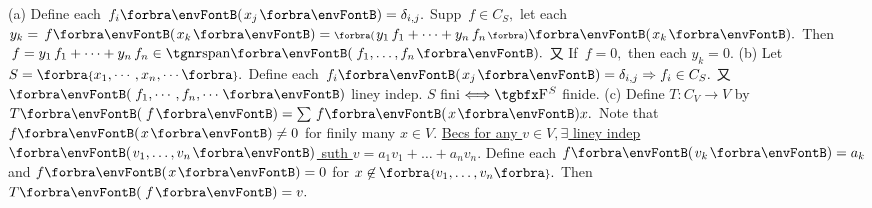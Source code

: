 (a) Define each $\,f_i\Par{x_j}=\delta_{i,j}.$ Supp $\,f\in C_S,$ let each $y_k=\,f\Par{x_k}=\BigPar{y_1\,f_1+\dots+y_n\,f_n}\Par{x_k}.$\parSol{\Ha}
Then $\,f=y_1\,f_1+\dots+y_n\,f_n\in\Span{\,f_1,\dots,f_n}.$ 又 If $\,f=0,$ then each $y_k=0.$\vspace{3pt}\parSol{}
(b) Let $S=\Bra{x_1,\cdots,x_n,\cdots}.$ Define each $\,f_i\Par{x_j}=\delta_{i,j}\Rightarrow f_i\in C_S.$ 又 $\Par{\,f_1,\cdots,f_n,\cdots}$ liney indep.\parSol{\Hb}
\ACoro $S$ fini $\Longleftrightarrow\FbbP{S}$ finide.\vspace{3pt}\parSol{}
(c) Define $T:C_V\rightarrow V$ by $T\Par{\,f}=\sum\,f\Par{x}x.$ Note that $f\Par{x}\neq0$ for finily many $x\in V.$\parSol{\Hc}
\uline{Becs for any $v\in V,\exists$ liney indep $\Par{v_1,\dots,v_n}$ suth $v=a_1v_1+\dots+a_nv_n.$} \parSol{\Hc}
Define each $\:\!f\Par{v_k}=a_k$ and $f\Par{x}=0$ for $x\not\in\;\!\!\Bra{v_1,\dots,v_n}.$ Then $T\Par{\,f}=v.$\PfEnd
\SepLine


